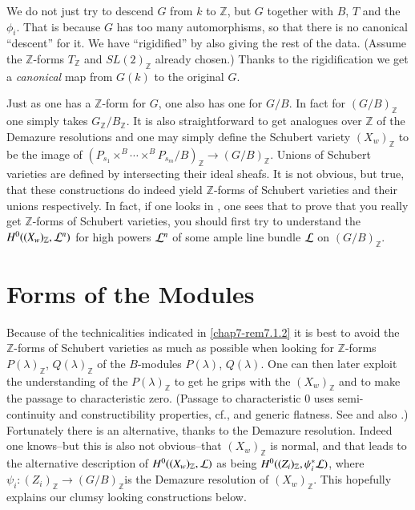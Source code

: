 \begin{remark}\label{chap7-rem7.1.1}
We do not just try to descend $G$ from $k$ to $\mathbb{Z}$, but $G$
together with $B$, $T$ and the $\phi_{i}$. That is because $G$ has too
many automorphisms, so that there is no canonical ``descent'' for
it. We have ``rigidified'' by also giving the rest of the
data. (Assume the $\mathbb{Z}$-forms $T_{\mathbb{Z}}$ and
$SL(2)_{\mathbb{Z}}$ already chosen.) Thanks to the rigidification we
get a {\em canonical} map from $G(k)$ to the original $G$.
\end{remark}

\begin{remark}\label{chap7-rem7.1.2}
Just as one has a $\mathbb{Z}$-form for $G$, one also has one for
$G/B$. In fact for $(G/B)_{\mathbb{Z}}$ one simply takes
$G_{\mathbb{Z}}/B_{\mathbb{Z}}$. It is also straightforward to get
analogues over $\mathbb{Z}$ of the Demazure resolutions and one may
simply define the Schubert variety $(X_{w})_{\mathbb{Z}}$ to be the
image of
$(P_{s_{1}}\times^{B}\cdots\times^{B}P_{s_{m}}/B)_{\mathbb{Z}}\to
(G/B)_{\mathbb{Z}}$. Unions of Schubert varieties are defined by
intersecting their ideal sheafs. It is not obvious, but true, that
these constructions do indeed yield $\mathbb{Z}$-forms of Schubert
varieties and their unions respectively. In fact, if one looks in
\cite{key11}, one sees that to prove that you really get
$\mathbb{Z}$-forms of Schubert varieties, you should first try to
understand the $H^{0}((X_{w})_{\mathbb{Z}},\mathcal{L}^{n})$ for high powers
$\mathcal{L}^{n}$ of some ample line bundle $\mathcal{L}$ on $(G/B)_{\mathbb{Z}}$.
\end{remark}

\section{Forms of the Modules}\label{chap7-sec7.2}

Because of the technicalities indicated in \ref{chap7-rem7.1.2} it is
best to avoid the $\mathbb{Z}$-forms of Schubert varieties as much as
possible when looking for $\mathbb{Z}$-forms
$P(\lambda)_{\mathbb{Z}}$, $Q(\lambda)_{\mathbb{Z}}$ of the
$B$-modules $P(\lambda)$, $Q(\lambda)$. One can then later exploit the
understanding of the $P(\lambda)_{\mathbb{Z}}$ to get he grips with
the $(X_{w})_{\mathbb{Z}}$ and to make the passage to characteristic
zero. (Passage to characteristic $0$ uses semi-continuity and
constructibility properties, cf.\@ \cite[9.2.6.2, 9.4.2,
  12.2.4]{key6}, and generic flatness. See \cite[II Chapter 14]{key11}
and also \cite{key17}.) Fortunately there is an alternative, thanks to
the Demazure resolution. Indeed one knows--but this is also not
obvious--that $(X_{w})_{\mathbb{Z}}$ is normal, and that leads to the
alternative description of $H^{0}((X_{w})_{\mathbb{Z}},\mathcal{L})$ as being
$H^{0}((Z_{i})_{\mathbb{Z}},\psi^{*}_{i}\mathcal{L})$, where
$\psi_{i}:(Z_{i})_{\mathbb{Z}}\to (G/B)_{\mathbb{Z}}$\pageoriginale is
the\label{page70} Demazure resolution of $(X_{w})_{\mathbb{Z}}$. This hopefully
explains our clumsy looking constructions below.

